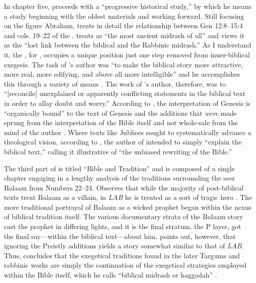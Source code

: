  In chapter five, \vermes proceeds with a ``progressive historical study,'' by which he means a study beginning with the oldest materials and working forward. Still focusing on the figure Abraham, \vermes treats in detail the relationship between Gen 12:8--15:4 and cols. 19--22 of the \ga. \vermes treats \ga as ``the most ancient midrash of all''\autocite[124]{vermes1961} and views it as the ``lost link between the biblical and the Rabbinic midrash.'' \autocite[124]{vermes1961} As I understand it, the \ga, for \vermes, occupies a unique position just one step removed from inner-biblical exegesis. The task of \ga's author was ``to make the biblical story more attractive, more real, more edifying, and above all more intelligible'' and he accomplishes this through a variety of means \autocite[125]{vermes1961}. The work of \ga's author, therefore, was to ``{[}reconcile{]} unexplained or apparently conflicting statements in the biblical text in order to allay doubt and worry.''\autocite[125]{vermes1961} According to \vermes, the interpretation of Genesis is ``organically bound'' to the text of Genesis and the additions that \emph{were} made sprung from the interpretation of the Bible itself and not whole-sale from the mind of the author \autocite[126]{vermes1961}. Where texts like Jubliees sought to systematically advance a theological vision, according to \vermes, the author of \ga intended to simply ``explain the biblical text,'' calling it illustrative of ``the unbiased rewriting of the Bible.''\autocite[126]{vermes1961} 

 The third part of  is titled ``Bible and Tradition'' and is composed of a single chapter engaging in a lengthy analysis of the traditions surrounding the seer Balaam from Numbers 22--24. \vermes Observes that while the majority of post-biblical texts treat Balaam as a villain, in \emph{LAB} he is treated as a sort of tragic hero \autocite[173]{vermes1961}. The more traditional portrayal of Balaam as a wicked prophet began within the nexus of biblical tradition itself. The various documentary strata of the Balaam story cast the prophet in differing lights, and it is the final stratum, the P layer, got the final say---within the biblical text---about him. \vermes points out, however, that ignoring the Preistly additions yields a story somewhat similar to that of \emph{LAB}. Thus, \vermes concludes that the exegetical traditions found in the later Targums and rabbinic works are simply the continuation of the exegetical strategies employed within the Bible itself, which he calls ``biblical midrash or haggadah'' \autocite[176]{vermes1961}. 

